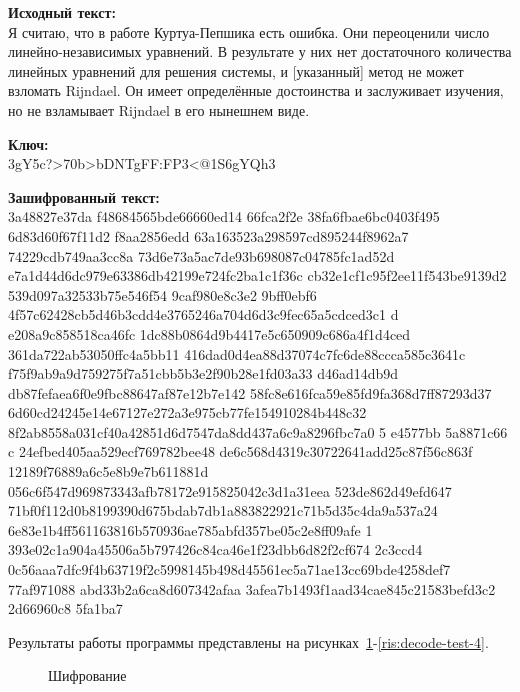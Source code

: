 \textbf{Исходный текст:} \\
    Я считаю, что в работе Куртуа-Пепшика есть ошибка. Они переоценили число
    линейно-независимых уравнений. В результате у них нет достаточного количества
    линейных уравнений для решения системы, и [указанный] метод не может взломать
    Rijndael. Он имеет определённые достоинства и заслуживает изучения, но не
    взламывает Rijndael в его нынешнем виде.

\textbf{Ключ:} \\
    3gY5c?>70b>bDNTgFF:FP3<@1S6gYQh3

\textbf{Зашифрованный текст:} \\
    3a48827e37da f48684565bde66660ed14 66fca2f2e 38fa6fbae6bc0403f495 6d83d60f67f11d2 f8aa2856edd 63a163523a298597cd895244f8962a7 74229cdb749aa3cc8a 73d6e73a5ac7de93b698087c04785fc1ad52d e7a1d44d6dc979e63386db42199e724fc2ba1c1f36c cb32e1cf1c95f2ee11f543be9139d2 539d097a32533b75e546f54 9caf980e8c3e2 9bff0ebf6 4f57c62428cb5d46b3cdd4e3765246a704d6d3c9fec65a5cdced3c1 d e208a9c858518ca46fc 1dc88b0864d9b4417e5c650909c686a4f1d4ced 361da722ab53050ffc4a5bb11 416dad0d4ea88d37074c7fc6de88ccca585c3641c f75f9ab9a9d759275f7a51cbb5b3e2f90b28e1fd03a33 d46ad14db9d db87fefaea6f0e9fbc88647af87e12b7e142 58fc8e616fca59e85fd9fa368d7ff87293d37 6d60cd24245e14e67127e272a3e975cb77fe154910284b448c32 8f2ab8558a031cf40a42851d6d7547da8dd437a6c9a8296fbc7a0 5 e4577bb 5a8871c66 c 24efbed405aa529ecf769782bee48 de6c568d4319c30722641add25c87f56c863f 12189f76889a6c5e8b9e7b611881d 056c6f547d969873343afb78172e915825042c3d1a31eea 523de862d49efd647 71bf0f112d0b8199390d675bdab7db1a883822921c71b5d35c4da9a537a24 6e83e1b4ff561163816b570936ae785abfd357be05c2e8ff09afe 1 393e02c1a904a45506a5b797426c84ca46e1f23dbb6d82f2cf674 2c3ccd4 0c56aaa7dfc9f4b63719f2c5998145b498d45561ec5a71ae13cc69bde4258def7 77af971088 abd33b2a6ca8d607342afaa 3afea7b1493f1aad34cae845c21583befd3c2 2d66960c8 5fa1ba7

Результаты работы программы представлены на рисунках~\ref{ris:encode-test-4}-\ref{ris:decode-test-4}.

\vspace{\baselineskip}
\begin{figure}[H]
    \caption{Шифрование}
\label{ris:encode-test-4}
\end{figure}

